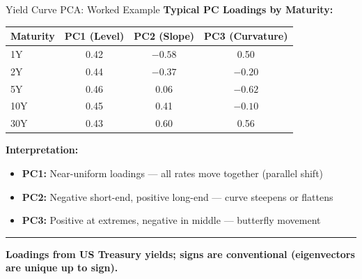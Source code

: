 \documentclass[8pt,aspectratio=169]{beamer}
\newcommand{\bottomnote}[1]{%
\vfill
\vspace{-2mm}
\textcolor{mllavender2}{\rule{\textwidth}{0.4pt}}
\vspace{1mm}
\footnotesize
\textbf{#1}
}
\begin{document}
\begin{frame}[t]{Yield Curve PCA: Worked Example}
\textbf{Typical PC Loadings by Maturity:}

\vspace{0.3em}
\begin{center}
\small
\begin{tabular}{lccc}
\toprule
\textbf{Maturity} & \textbf{PC1 (Level)} & \textbf{PC2 (Slope)} & \textbf{PC3 (Curvature)} \\
\midrule
1Y  & 0.42 & $-0.58$ & 0.50 \\
2Y  & 0.44 & $-0.37$ & $-0.20$ \\
5Y  & 0.46 & 0.06 & $-0.62$ \\
10Y & 0.45 & 0.41 & $-0.10$ \\
30Y & 0.43 & 0.60 & 0.56 \\
\bottomrule
\end{tabular}
\end{center}

\vspace{0.3em}
\textbf{Interpretation:}
\begin{itemize}
  \item \textbf{PC1:} Near-uniform loadings --- all rates move together (parallel shift)
  \item \textbf{PC2:} Negative short-end, positive long-end --- curve steepens or flattens
  \item \textbf{PC3:} Positive at extremes, negative in middle --- butterfly movement
\end{itemize}
\bottomnote{Loadings from US Treasury yields; signs are conventional (eigenvectors are unique up to sign).}
\end{frame}
\end{document}

